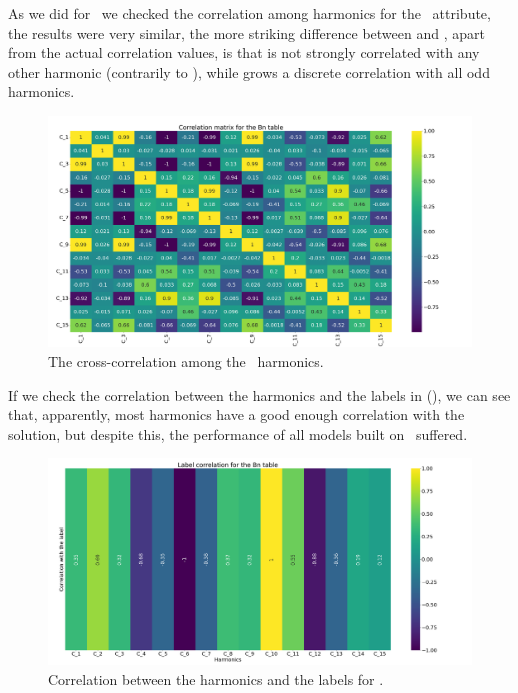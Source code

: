 As we did for \an\ we checked the correlation among harmonics for the \bn\ attribute, the results
were very similar, the more striking difference between  and ,
apart from the actual correlation values, is that \bn[2] is not strongly correlated with any other
harmonic (contrarily to \an[2]), while \bn[15] grows a discrete correlation with all odd harmonics.
\begin{figure}[!ht]
	\centering
	\includegraphics[width=\linewidth]{img/Bn_corr_matrix.png}
	\caption{The cross-correlation among the \bn\ harmonics.} \label{fig:bn-corr}
\end{figure}

If we check the correlation between the harmonics and the labels in (), we can see
that, apparently, most harmonics have a good enough correlation with the solution, but despite this, the performance of all
models built on \bn\ suffered.
\begin{figure}[!ht]
	\centering
	\includegraphics[width=\linewidth]{img/Bn_label_corr.png}
	\caption{Correlation between the harmonics and the labels for \bn.} \label{fig:bn-lcorr}
\end{figure}

